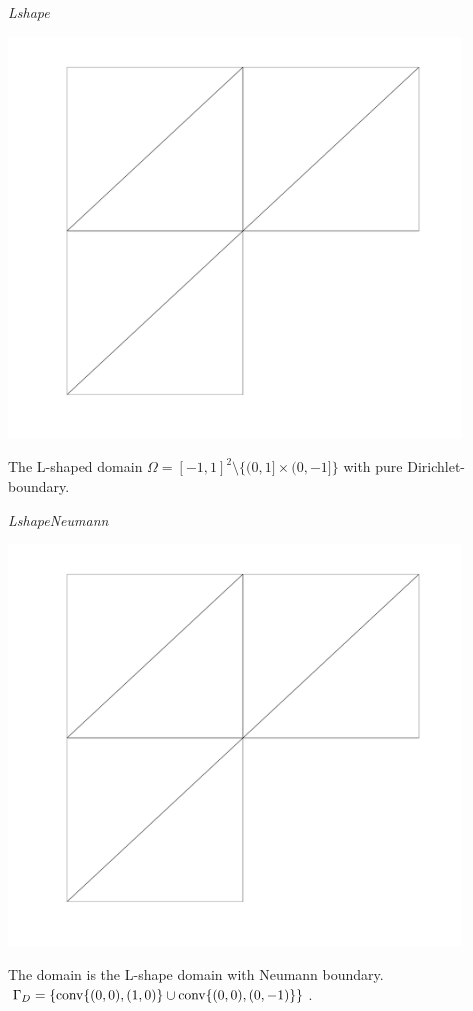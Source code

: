 \noindent\emph{Lshape}\smallskip\\
\begin{minipage}{0.14\textwidth}
\includegraphics[width=0.9\textwidth]{images/sect_ImplementedProblems_Lshape.pdf}
\end{minipage}
\begin{minipage}{0.85\textwidth}
The L-shaped domain $\Omega=[-1,1]^2\setminus\{(0,1]\times(0,-1]\}$ with pure Dirichlet-boundary.
\end{minipage}
\bigskip

\noindent\emph{LshapeNeumann}\smallskip\\
\begin{minipage}{0.14\textwidth}
\includegraphics[width=0.9\textwidth]{images/sect_ImplementedProblems_Lshape.pdf}
\end{minipage}
\begin{minipage}{0.85\textwidth}
The domain is the L-shape domain with Neumann boundary.  $\Gamma_D=\left\{\operatorname{conv}\{(0,0),(1,0)\}\cup\operatorname{conv}\{(0,0),(0,-1)\}\right\}$.
\end{minipage}
\bigskip

